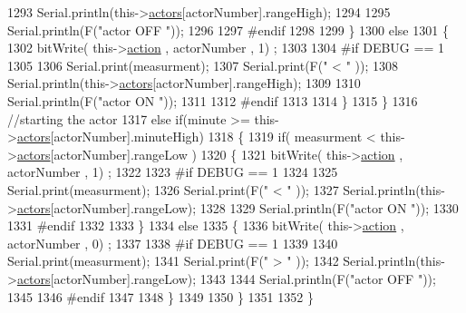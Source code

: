 \begin{DoxyCode}
1293                 Serial.println(this->\hyperlink{class_jetpack_a7e16d2f97837f9712a2e6de1c50d99db}{actors}[actorNumber].rangeHigh);
1294 
1295                 Serial.println(F(\textcolor{stringliteral}{"actor OFF "}));
1296 
1297 \textcolor{preprocessor}{            #endif}
1298     
1299             \}
1300             \textcolor{keywordflow}{else} 
1301             \{
1302                 bitWrite( this->\hyperlink{class_jetpack_aca3142925a7b0834b34ae91d26af7765}{action} , actorNumber , 1) ;
1303 
1304 \textcolor{preprocessor}{            #if DEBUG == 1 }
1305 
1306                 Serial.print(measurment);
1307                 Serial.print(F(\textcolor{stringliteral}{" < "} ));
1308                 Serial.println(this->\hyperlink{class_jetpack_a7e16d2f97837f9712a2e6de1c50d99db}{actors}[actorNumber].rangeHigh);
1309 
1310                 Serial.println(F(\textcolor{stringliteral}{"actor ON "}));
1311 
1312 \textcolor{preprocessor}{            #endif  }
1313                 
1314             \}
1315     \}   
1316     \textcolor{comment}{//starting the actor}
1317     \textcolor{keywordflow}{else} \textcolor{keywordflow}{if}(minute >= this->\hyperlink{class_jetpack_a7e16d2f97837f9712a2e6de1c50d99db}{actors}[actorNumber].minuteHigh)
1318     \{
1319             \textcolor{keywordflow}{if}( measurment < this->\hyperlink{class_jetpack_a7e16d2f97837f9712a2e6de1c50d99db}{actors}[actorNumber].rangeLow )
1320             \{
1321                 bitWrite( this->\hyperlink{class_jetpack_aca3142925a7b0834b34ae91d26af7765}{action} , actorNumber , 1) ;
1322 
1323 \textcolor{preprocessor}{            #if DEBUG == 1 }
1324 
1325                 Serial.print(measurment);
1326                 Serial.print(F(\textcolor{stringliteral}{" < "} ));
1327                 Serial.println(this->\hyperlink{class_jetpack_a7e16d2f97837f9712a2e6de1c50d99db}{actors}[actorNumber].rangeLow);
1328 
1329                 Serial.println(F(\textcolor{stringliteral}{"actor ON "}));
1330 
1331 \textcolor{preprocessor}{            #endif  }
1332 
1333             \}
1334             \textcolor{keywordflow}{else} 
1335             \{
1336                 bitWrite( this->\hyperlink{class_jetpack_aca3142925a7b0834b34ae91d26af7765}{action} , actorNumber , 0) ;
1337             
1338 \textcolor{preprocessor}{            #if DEBUG == 1 }
1339 
1340                 Serial.print(measurment);
1341                 Serial.print(F(\textcolor{stringliteral}{" > "} ));
1342                 Serial.println(this->\hyperlink{class_jetpack_a7e16d2f97837f9712a2e6de1c50d99db}{actors}[actorNumber].rangeLow);
1343 
1344                 Serial.println(F(\textcolor{stringliteral}{"actor OFF "}));
1345 
1346 \textcolor{preprocessor}{            #endif  }
1347                 
1348             \}
1349 
1350     \}
1351 
1352 \}
\end{DoxyCode}
